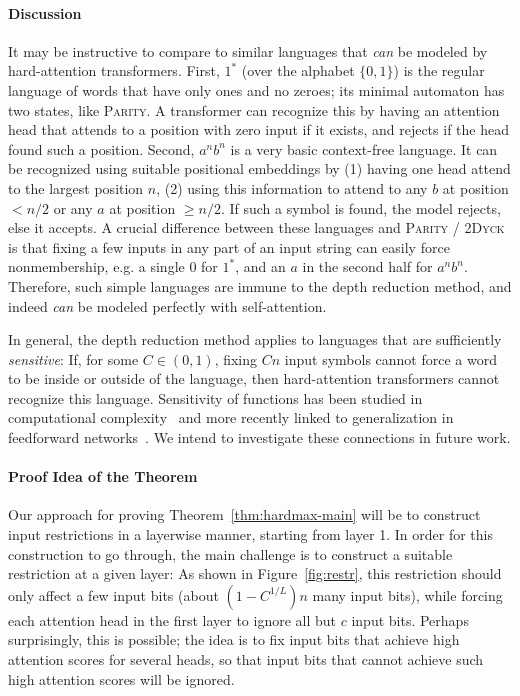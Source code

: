 \documentclass[11pt,a4paper]{article}
\begin{document}
\paragraph{Discussion}
It may be instructive to compare to similar languages that \emph{can} be modeled by hard-attention transformers.
First, $1^*$ (over the alphabet $\{0,1\}$) is the regular language of words that have only ones and no zeroes; its minimal automaton has two states, like \textsc{Parity}.
A transformer can recognize this by having an attention head that attends to a position with zero input if it exists, and rejects if the head found such a position.
Second, $a^nb^n$ is a very basic context-free language.
It can be recognized using suitable positional embeddings by (1) having one head attend to the largest position $n$, (2) using this information to attend to any $b$ at position $<n/2$ or any $a$ at position $\geq n/2$. If such a symbol is found, the model rejects, else it accepts.
A crucial difference between these languages and \textsc{Parity} / \textsc{2Dyck} is that fixing a few inputs in any part of an input string can easily force nonmembership, e.g. a single 0 for $1^*$, and an $a$ in the second half for $a^nb^n$.
Therefore, such simple languages are immune to the depth reduction method, and indeed \emph{can} be modeled perfectly with self-attention.

In general, the depth reduction method applies to languages that are sufficiently \emph{sensitive}: If, for some $C \in (0,1)$, fixing $Cn$ input symbols cannot force a word to be inside or outside of the language, then hard-attention transformers cannot recognize this language.
Sensitivity of functions %
has been studied in computational complexity~\cite{boppana1997average,gopalan2016smooth} and more recently linked to generalization in feedforward networks~\cite{de2018deep}.
We intend to investigate these connections in future work.



\paragraph{Proof Idea of the Theorem}
Our approach for proving Theorem~\ref{thm:hardmax-main} will be to construct input restrictions in a layerwise manner, starting from layer 1. 
In order for this construction to go through, the main challenge is to construct a suitable restriction at a given layer:
As shown in Figure~\ref{fig:restr}, this restriction should only affect a few input bits (about $(1-C^{1/L})n$ many input bits), while forcing each attention head in the first layer to ignore all but $c$ input bits.
Perhaps surprisingly, this is possible; the idea is to fix input bits that achieve high attention scores for several heads, so that input bits that cannot achieve such high attention scores will be ignored.
\end{document}
